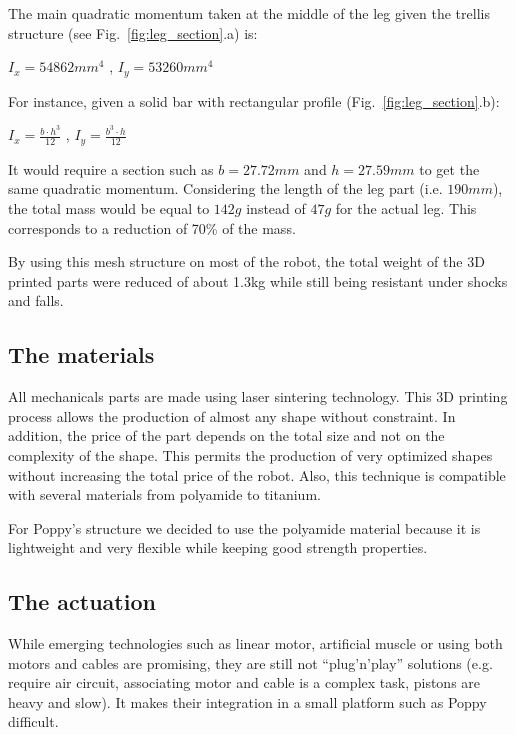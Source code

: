 The main quadratic momentum taken at the middle of the leg given the trellis structure (see Fig.~\ref{fig:leg_section}.a) is:

\begin{center}
    $I_x = 54862 mm^4$
    ,
    $I_y = 53260 mm^4$
\end{center}

For instance, given a solid bar with rectangular profile (Fig.~\ref{fig:leg_section}.b):

{\centering
    $I_x = \frac{b \cdot h^3}{12}$
    ,
    $I_y = \frac{b^3 \cdot h}{12}$

}
It would require a section such as $b=27.72 mm$ and $h=27.59 mm$ to get the same quadratic momentum.
Considering the length of the leg part (i.e.
$190 mm$), the total mass would be equal to $142 g$ instead of $47 g$ for the actual leg.
This corresponds to a reduction of 70\% of the mass.

By using this mesh structure on most of the robot, the total weight of the 3D
printed parts were reduced of about 1.3kg while still being resistant under shocks and falls.


\subsection{The materials} %
All mechanicals parts are made using laser sintering technology.
This 3D printing process allows the production of almost any shape without constraint.
In addition, the price of the part depends on the total size and not on the complexity of the shape.
This permits the production of very optimized shapes without increasing the total price of the robot.
Also, this technique is compatible with several materials from polyamide to titanium.

For Poppy's structure we decided to use the polyamide material because it is lightweight and very flexible while keeping good strength properties.

\subsection{The actuation} %

While emerging technologies such as linear motor, artificial muscle or using both motors and cables are promising, they are still not ``plug'n'play'' solutions (e.g.
require air circuit, associating motor and cable is a complex task, pistons are heavy and slow).
It makes their integration in a small platform such as Poppy difficult.

